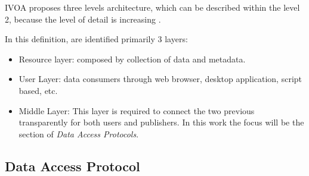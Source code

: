 
IVOA proposes three levels architecture, which can be described within the
level 2, because the level of detail is increasing \cite{arch}.

In this definition, are identified primarily 3 layers:
\begin{itemize} \itemsep 0.5pt
	\item Resource layer: composed by collection of data and metadata.
	\item User Layer: data consumers through web browser, desktop application, script based, etc.
	\item Middle Layer: This layer is required to connect the two previous
transparently for both users and publishers. In this work the focus will be the
section of \emph{Data Access Protocols}.
\end{itemize}

\subsection{Data Access Protocol}

